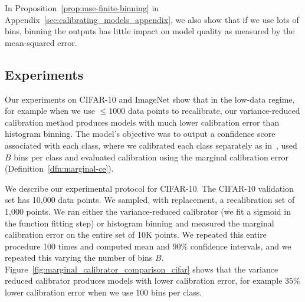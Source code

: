 In Proposition~\ref{prop:mse-finite-binning} in Appendix~\ref{sec:calibrating_models_appendix}, we also show that if we use lots of  bins, binning the outputs has little impact on model quality as measured by the mean-squared error.



\subsection{Experiments}

Our experiments on CIFAR-10 and ImageNet show that in the low-data regime, for example when we use $\leq 1000$ data points to recalibrate, our variance-reduced calibration method produces models with much lower calibration error than histogram binning. The model's objective was to output a confidence score associated with each class, where we calibrated each class separately as in~\cite{zadrozny2002transforming}, used $B$ bins per class and evaluated calibration using the marginal calibration error (Definition~\ref{dfn:marginal-ce}).

We describe our experimental protocol for CIFAR-10.
The CIFAR-10 validation set has 10,000 data points. We sampled, with replacement, a recalibration set of 1,000 points. We ran either the variance-reduced calibrator (we fit a sigmoid in the function fitting step) or histogram binning and measured the marginal calibration error on the entire set of 10K points.
We repeated this entire procedure 100 times and computed mean and 90\% confidence intervals, and we repeated this varying the number of bins $B$. Figure~\ref{fig:marginal_calibrator_comparison_cifar} shows that the variance reduced calibrator produces models with lower calibration error, for example $35\%$ lower calibration error when we use 100 bins per class.

